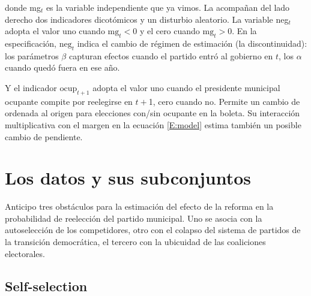 \documentclass[letter,12pt]{article}
\begin{document}
\noindent donde mg$_t$ es la variable independiente que ya vimos. La acompañan del lado derecho dos indicadores dicotómicos y un disturbio aleatorio. La variable neg$_t$ adopta el valor uno cuando $\text{mg}_t < 0$ y el cero cuando $\text{mg}_t>0$. En la especificación, $\text{neg}_t$ indica el cambio de régimen de estimación (la discontinuidad): los parámetros $\beta$ capturan efectos cuando el partido entró al gobierno en $t$, los $\alpha$ cuando quedó fuera en ese año.


Y el indicador $\text{ocup}_{t+1}$ adopta el valor uno cuando el presidente municipal ocupante compite por reelegirse en $t+$1, cero cuando no. Permite un cambio de ordenada al origen para elecciones con/sin ocupante en la boleta. Su interacción multiplicativa con el margen en la ecuación \ref{E:model} estima también un posible cambio de pendiente.

\section{Los datos y sus subconjuntos}

\noindent Anticipo tres obstáculos para la estimación del efecto de la reforma en la probabilidad de reelección del partido municipal. Uno se asocia con la autoselección de los competidores, otro con el colapso del sistema de partidos de la transición democrática, el tercero con la ubicuidad de las coaliciones electorales.

\subsection{Self-selection}
\end{document}
